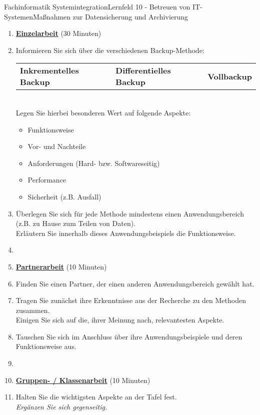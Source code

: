\documentclass[oneside,openany,headings=optiontotoc,11pt,numbers=noenddot,Nassi]{scrreprt}
\begin{document}
	\begin{worksheet}{Fachinformatik Systemintegration}{Lernfeld 10 - Betreuen von IT-Systemen}{Maßnahmen zur Datensicherung und Archivierung}
		\begin{framed}
			\noindent
			\begin{enumerate}
				\item[] \textbf{\underline{Einzelarbeit}} (30 Minuten)
				\item Informieren Sie sich über die verschiedenen Backup-Methode:\\
				\begin{tabularx}{0.98\textwidth}{X|X|X}
					\textbf{Inkrementelles Backup} & \textbf{Differentielles Backup} & \textbf{Vollbackup}\\
				\end{tabularx}\\
				Legen Sie hierbei besonderen Wert auf folgende Aspekte:
				\begin{itemize}
					\item Funktionsweise
					\item Vor- und Nachteile
					\item Anforderungen (Hard- bzw. Softwareseitig)
					\item Performance
					\item Sicherheit (z.B. Ausfall)
				\end{itemize}
				\item Überlegen Sie sich für jede Methode mindestens einen Anwendungsbereich (z.B. zu Hause zum Teilen von Daten).\\
				Erläutern Sie innerhalb dieses Anwendungsbeispiels die Funktionsweise.\\
				\item[] 
				\item[] \textbf{\underline{Partnerarbeit}} (10 Minuten)
				\item Finden Sie einen Partner, der einen anderen Anwendungsbereich gewählt hat.
				\item Tragen Sie zunächst ihre Erkenntnisse aus der Recherche zu den Methoden zusammen.\\
				Einigen Sie sich auf die, ihrer Meinung nach, relevantesten Aspekte.
				\item Tauschen Sie sich im Anschluss über ihre Anwendungsbeispiele und deren Funktionsweise aus.\\
				\item[] 
				\item[] \textbf{\underline{Gruppen- / Klassenarbeit}} (10 Minuten)
				\item Halten Sie die wichtigsten Aspekte an der Tafel fest.\\
				\textit{Ergänzen Sie sich gegenseitig.}
			\end{enumerate}
		\end{framed}
	\end{worksheet}
\end{document}
